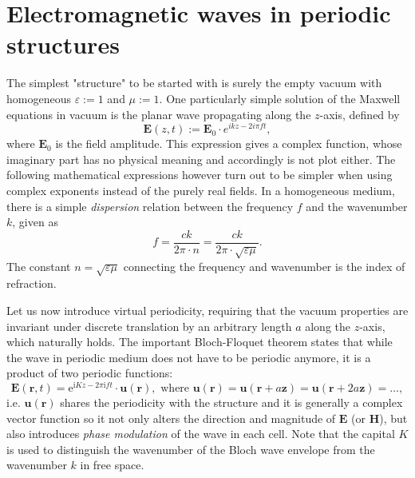 \documentclass[letterpaper,12pt]{report}
\begin{document}




\section{Electromagnetic waves in periodic structures}
The simplest "structure" to be started with is surely the empty vacuum with homogeneous $\varepsilon := 1$ and $\mu := 1$. One particularly simple solution of the Maxwell equations in vacuum is the planar wave propagating along the $z$-axis, defined by%
\begin{equation} \mathbf{E}(z, t) := \mathbf{E}_0 \cdot e^{ikz- 2i\pi f t}, \label{eq_pw}\end{equation}
where $\mathbf{E}_0$ is the field amplitude.  This expression gives a complex function, whose imaginary part has no physical meaning and accordingly is not plot either. The following mathematical expressions however turn out to be simpler when using complex exponents instead of the purely real fields.
In a homogeneous medium, there is a simple \textit{dispersion} relation between the frequency  $f$ and the wavenumber $k$, given as
\begin{equation} f = \frac{ck}{2\pi \cdot n} = \frac{ck}{2\pi \cdot \sqrt{\varepsilon \mu}}. \label{eq_dispersion}\end{equation}
The constant $n = \sqrt{\varepsilon \mu}$ connecting the frequency and wavenumber is the index of refraction.

Let us now introduce virtual periodicity, requiring that the vacuum properties are invariant under discrete translation by an arbitrary length $a$ along the $z$-axis, which naturally holds. The important Bloch-Floquet theorem states that while the wave in periodic medium does not have to be periodic anymore, it is a product of two periodic functions:
\begin{equation} \mathbf{E}(\mathbf{r}, t) = \mathrm{e}^{\mathrm{i} Kz - 2\pi \mathrm{i} f t} \cdot \mathbf{u}(\mathbf{r}), \text{ where } \mathbf{u}(\mathbf{r}) = \mathbf{u}(\mathbf{r}+a\mathbf{z}) = \mathbf{u}(\mathbf{r}+2a\mathbf{z}) = \ldots, \label{eq_bloch}\end{equation} 
i.e. $\mathbf{u}(\mathbf{r})$ shares the periodicity with the structure and it is generally a complex vector function so it not only alters the direction and magnitude of $\mathbf E$ (or  $\mathbf H$), but also introduces \textit{phase modulation} of the wave in each cell. Note that the capital $K$ is used to distinguish the wavenumber of the Bloch wave envelope from the wavenumber $k$ in free space.
\end{document}

